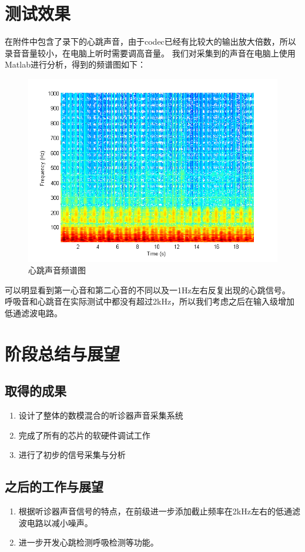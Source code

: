 \documentclass[16pt,a4paper]{article}
\begin{document}
\section{测试效果}
在附件中包含了录下的心跳声音，由于codec已经有比较大的输出放大倍数，所以录音音量较小，在电脑上听时需要调高音量。
我们对采集到的声音在电脑上使用Matlab进行分析，得到的频谱图如下：
\begin{figure}[H]
\centering
\includegraphics[scale = 1]{spectrogram.png}
\caption{心跳声音频谱图} 
\end{figure}
可以明显看到第一心音和第二心音的不同以及一1Hz左右反复出现的心跳信号。\linebreak
呼吸音和心跳音在实际测试中都没有超过2kHz，所以我们考虑之后在输入级增加低通滤波电路。

\section{阶段总结与展望}
\subsection{取得的成果}
\begin{enumerate}
\item 设计了整体的数模混合的听诊器声音采集系统
\item 完成了所有的芯片的软硬件调试工作
\item 进行了初步的信号采集与分析
\end{enumerate}
\subsection{之后的工作与展望}
\begin{enumerate}
\item 根据听诊器声音信号的特点，在前级进一步添加截止频率在2kHz左右的低通滤波电路以减小噪声。
\item 进一步开发心跳检测呼吸检测等功能。
\end{enumerate}
\end{document}
